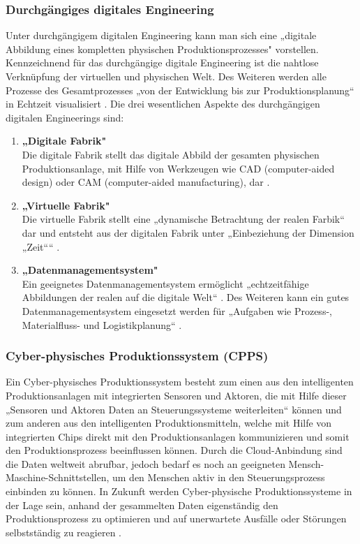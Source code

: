 \subsubsection{Durchgängiges digitales Engineering}\label{sec:DigitalesEngineering}
Unter durchgängigem digitalen Engineering kann man sich eine „digitale Abbildung eines kompletten physischen Produktionsprozesses" \cite[S.41]{14} vorstellen. Kennzeichnend für das durchgängige digitale Engineering ist die nahtlose Verknüpfung der virtuellen und physischen Welt. Des Weiteren werden alle Prozesse des Gesamtprozesses „von der Entwicklung bis zur Produktionsplanung“ \cite[S.41]{14} in Echtzeit visualisiert \cite[S.41]{14}.
\newline\newline
Die drei wesentlichen Aspekte des durchgängigen digitalen Engineerings sind:
\begin{enumerate}
	\item \textbf{„Digitale Fabrik"} \cite[S.41]{14} \\ 
	Die digitale Fabrik stellt das digitale Abbild der gesamten physischen Produktionsanlage, mit Hilfe von Werkzeugen wie CAD (computer-aided design) oder CAM (computer-aided manufacturing), dar \cite[S.41]{14}.
	\item \textbf{„Virtuelle Fabrik"} \cite[S.41]{14} \\
	Die virtuelle Fabrik stellt eine „dynamische Betrachtung der realen Farbik“ \cite[S.41]{14} dar und entsteht aus der digitalen Fabrik unter „Einbeziehung der Dimension „Zeit““ \cite[S.41]{14}.
	\item \textbf{„Datenmanagementsystem"} \cite[S.41]{14} \\
	Ein geeignetes Datenmanagementsystem ermöglicht „echtzeitfähige Abbildungen der realen auf die digitale Welt“ \cite[S.41]{14}. Des Weiteren kann ein gutes Datenmanagementsystem eingesetzt werden für „Aufgaben wie Prozess-, Materialfluss- und Logistikplanung“ \cite[S.41]{14}.
\end{enumerate}

\subsubsection{Cyber-physisches Produktionssystem (CPPS)}\label{sec:CPPS}
Ein Cyber-physisches Produktionssystem besteht zum einen aus den intelligenten Produktionsanlagen mit integrierten Sensoren und Aktoren, die mit Hilfe dieser „Sensoren und Aktoren Daten an Steuerungssysteme weiterleiten“ \cite[S.42]{14} können und zum anderen aus den intelligenten Produktionsmitteln, welche mit Hilfe von integrierten Chips direkt mit den Produktionsanlagen kommunizieren und somit den Produktionsprozess beeinflussen können. Durch die Cloud-Anbindung sind die Daten weltweit abrufbar, jedoch bedarf es noch an geeigneten Mensch-Maschine-Schnittstellen, um den Menschen aktiv in den Steuerungsprozess einbinden zu können. In Zukunft werden Cyber-physische Produktionssysteme in der Lage sein, anhand der gesammelten Daten eigenständig den Produktionsprozess zu optimieren und auf unerwartete Ausfälle oder Störungen selbstständig zu reagieren \cite[S.42]{14}.

